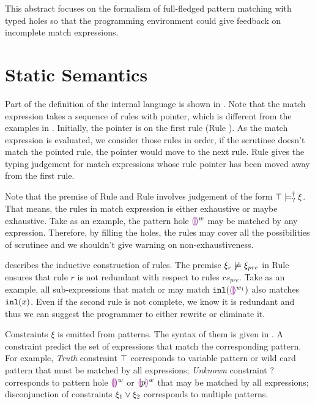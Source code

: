 \documentclass[acmsmall,screen,review,nonacm]{acmart}
\theoremstyle{slplain}
\numberwithin{thm}{section}
\begin{document}
This abstract focuses on the formalism of full-fledged pattern matching with typed holes so that the programming environment could give feedback on incomplete match expressions.

\section{Static Semantics}
\label{sec:statics}



Part of the definition of the internal language is shown in . Note that the match expression takes a sequence of rules with pointer, which is different from the examples in . Initially, the pointer is on the first rule (Rule \TMatchZPre). As the match expression is evaluated, we consider those rules in order, if the scrutinee doesn't match the pointed rule, the pointer would move to the next rule. Rule \TMatchNZPre gives the typing judgement for match expressions whose rule pointer has been moved away from the first rule.

Note that the premise of Rule \TMatchZPre and Rule \TMatchNZPre involves judgement of the form $\top \models_{?}^{\dag} \xi$. That means, the rules in match expression is either exhaustive or maybe exhaustive.
Take  as an example, the pattern hole $\textcolor{violet}{\llparenthesis}\textcolor{violet}{\rrparenthesis}^{w}$ may be matched by any expression. Therefore, by filling the holes, the rules may cover all the possibilities of scrutinee and we shouldn't give warning on non-exhaustiveness.



 describes the inductive construction of rules. The premise $\xi_r \not\models \xi_{pre}$ in Rule \TRules ensures that rule $r$ is not redundant with respect to rules $rs_{pre}$.
Take  as an example, all sub-expressions that match or may match $\mathtt{inl}(\textcolor{violet}{\llparenthesis}\textcolor{violet}{\rrparenthesis}^{w_1})$ also matches $\mathtt{inl}(x)$. Even if the second rule is not complete, we know it is redundant and thus we can suggest the programmer to either rewrite or eliminate it.



Constraints $\xi$ is emitted from patterns. The syntax of them is given in . A constraint predict the set of expressions that match the corresponding pattern.
For example, \emph{Truth} constraint $\top$ corresponds to variable pattern or wild card pattern that must be matched by all expressions;
\emph{Unknown} constraint $?$ corresponds to pattern hole $\textcolor{violet}{\llparenthesis}\textcolor{violet}{\rrparenthesis}^{w}$ or $\textcolor{violet}{\llparenthesis} p\textcolor{violet}{\rrparenthesis}^{w}$ that may be matched by all expressions;
disconjunction of constraints $\xi_1 \vee \xi_2$ corresponds to multiple patterns.
\end{document}
